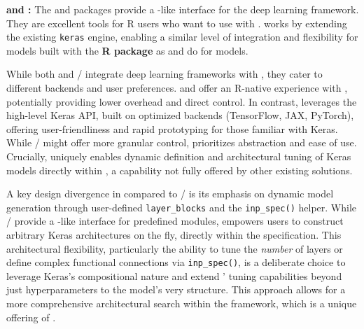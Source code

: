 \textbf{ and :} The  \citep{luz} and  packages provide a -like interface for the  deep learning framework. They are excellent tools for R users who want to use  with .  works by extending the existing  \texttt{keras} engine, enabling a similar level of integration and flexibility for models built with the \textbf{ R package} as  and  do for  models.

While both  and / integrate deep learning frameworks with , they cater to different backends and user preferences.  and  offer an R-native experience with , potentially providing lower overhead and direct control. In contrast,  leverages the high-level Keras API, built on optimized backends (TensorFlow, JAX, PyTorch), offering user-friendliness and rapid prototyping for those familiar with Keras. While / might offer more granular control,  prioritizes abstraction and ease of use. Crucially,  uniquely enables dynamic definition and architectural tuning of Keras models directly within , a capability not fully offered by other existing solutions.

A key design divergence in  compared to / is its emphasis on dynamic model generation through user-defined \texttt{layer\_blocks} and the \texttt{inp\_spec()} helper. While / provide a -like interface for predefined  modules,  empowers users to construct arbitrary Keras architectures on the fly, directly within the  specification. This architectural flexibility, particularly the ability to tune the \emph{number} of layers or define complex functional connections via \texttt{inp\_spec()}, is a deliberate choice to leverage Keras's compositional nature and extend ' tuning capabilities beyond just hyperparameters to the model's very structure. This approach allows for a more comprehensive architectural search within the  framework, which is a unique offering of .

